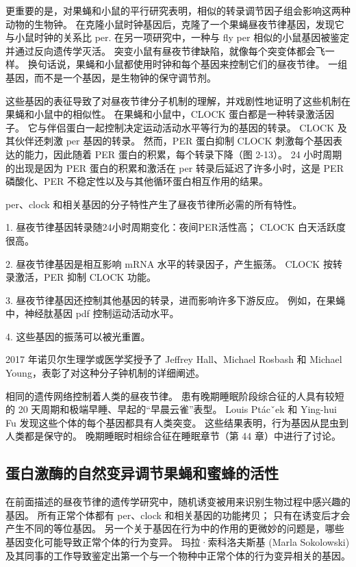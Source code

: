 更重要的是，对果蝇和小鼠的平行研究表明，相似的转录调节因子组会影响这两种动物的生物钟。 
在克隆小鼠时钟基因后，克隆了一个果蝇昼夜节律基因，发现它与小鼠时钟的关系比 per. 在另一项研究中，一种与 fly per 相似的小鼠基因被鉴定并通过反向遗传学灭活。 
突变小鼠有昼夜节律缺陷，就像每个突变体都会飞一样。 
换句话说，果蝇和小鼠都使用时钟和每个基因来控制它们的昼夜节律。 
一组基因，而不是一个基因，是生物钟的保守调节剂。


这些基因的表征导致了对昼夜节律分子机制的理解，并戏剧性地证明了这些机制在果蝇和小鼠中的相似性。 
在果蝇和小鼠中，CLOCK 蛋白都是一种转录激活因子。 
它与伴侣蛋白一起控制决定运动活动水平等行为的基因的转录。 
CLOCK 及其伙伴还刺激 per 基因的转录。 
然而，PER 蛋白抑制 CLOCK 刺激每个基因表达的能力，因此随着 PER 蛋白的积累，每个转录下降（图 2-13）。 
24 小时周期的出现是因为 PER 蛋白的积累和激活在 per 转录后延迟了许多小时，这是 PER 磷酸化、PER 不稳定性以及与其他循环蛋白相互作用的结果。


per、clock 和相关基因的分子特性产生了昼夜节律所必需的所有特性。

1. 昼夜节律基因转录随24小时周期变化：夜间PER活性高； CLOCK 白天活跃度很高。

2. 昼夜节律基因是相互影响 mRNA 水平的转录因子，产生振荡。 CLOCK 按转录激活，PER 抑制 CLOCK 功能。

3. 昼夜节律基因还控制其他基因的转录，进而影响许多下游反应。 例如，在果蝇中，神经肽基因 pdf 控制运动活动水平。

4. 这些基因的振荡可以被光重置。

2017 年诺贝尔生理学或医学奖授予了 Jeffrey Hall、Michael Rosbash 和 Michael Young，表彰了对这种分子钟机制的详细阐述。

相同的遗传网络控制着人类的昼夜节律。 
患有晚期睡眠阶段综合征的人具有较短的 20 天周期和极端早睡、早起的“早晨云雀”表型。 
Louis Ptácˇek 和 Ying-hui Fu 发现这些个体的每个基因都具有人类突变。 
这些结果表明，行为基因从昆虫到人类都是保守的。 
晚期睡眠时相综合征在睡眠章节（第 44 章）中进行了讨论。


\subsection{蛋白激酶的自然变异调节果蝇和蜜蜂的活性}
在前面描述的昼夜节律的遗传学研究中，随机诱变被用来识别生物过程中感兴趣的基因。 
所有正常个体都有 per、clock 和相关基因的功能拷贝； 只有在诱变后才会产生不同的等位基因。 
另一个关于基因在行为中的作用的更微妙的问题是，哪些基因变化可能导致正常个体的行为变异。 
玛拉·索科洛夫斯基 (Marla Sokolowski) 及其同事的工作导致鉴定出第一个与一个物种中正常个体的行为变异相关的基因。


